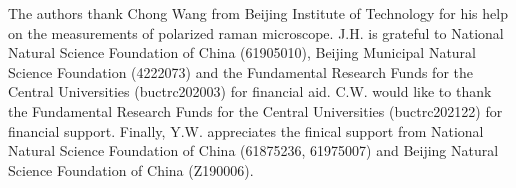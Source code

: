 \documentclass[journal=jacsat,manuscript=article]{achemso}
\begin{document}
\begin{acknowledgement}

The authors thank Chong Wang from Beijing Institute of Technology for his help on the measurements of polarized raman microscope. J.H. is grateful to National Natural Science Foundation of China (61905010), Beijing Municipal Natural Science Foundation (4222073) and the Fundamental Research Funds for the Central Universities (buctrc202003) for financial aid. C.W. would like to thank the Fundamental Research Funds for the Central Universities (buctrc202122) for financial support. Finally, Y.W. appreciates the finical support from National Natural Science Foundation of China (61875236, 61975007) and Beijing Natural Science Foundation of China (Z190006).

\end{acknowledgement}



\end{document}

